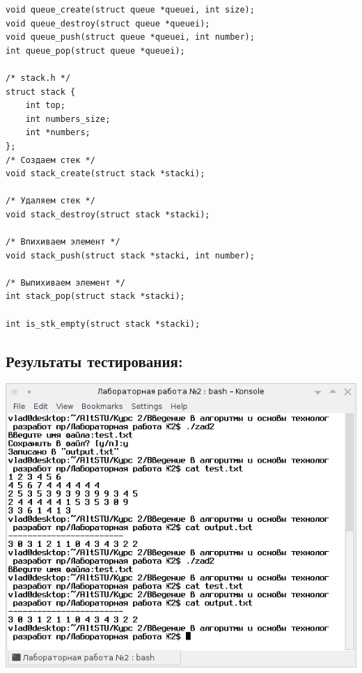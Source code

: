 \documentclass[a4paper,14pt]{extreport}
\begin{document}
\begin{verbatim}
void queue_create(struct queue *queuei, int size);
void queue_destroy(struct queue *queuei);
void queue_push(struct queue *queuei, int number);
int queue_pop(struct queue *queuei);

/* stack.h */
struct stack {
    int top;        
    int numbers_size;
    int *numbers;
};
/* Создаем стек */
void stack_create(struct stack *stacki);

/* Удаляем стек */
void stack_destroy(struct stack *stacki);

/* Впихиваем элемент */
void stack_push(struct stack *stacki, int number);

/* Выпихиваем элемент */
int stack_pop(struct stack *stacki);

int is_stk_empty(struct stack *stacki);	

\end{verbatim}
\normalsize
\subsection*{Результаты тестирования:}
\begin{center}
	\includegraphics[scale = 1]{1.png}
\end{center}
\end{document}
